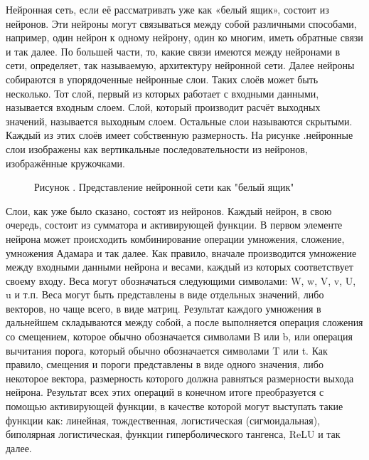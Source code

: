 {	\par \redline Нейронная сеть, если её рассматривать уже как «белый ящик», состоит из нейронов. Эти нейроны могут связываться между собой различными способами, например, один нейрон к одному нейрону, один ко многим, иметь обратные связи и так далее. По большей части, то, какие связи имеются между нейронами в сети, определяет, так называемую, архитектуру нейронной сети. Далее нейроны собираются в упорядоченные нейронные слои. Таких слоёв может быть несколько. Тот слой, первый из которых работает с входными данными, называется входным слоем. Слой, который производит расчёт выходных значений, называется выходным слоем. Остальные слои называются скрытыми. Каждый из этих слоёв имеет собственную размерность. На рисунке \thechaptercntr.\theimagecntr \spc нейронные слои изображены как вертикальные последовательности из нейронов, изображённые кружочками.
	
	\begin{figure}[H]
		\centering
		\def\svgwidth{\textwidth}
		
		\caption*{\gostFont Рисунок \thechaptercntr .\theimagecntr \spc {--} Представление нейронной сети как "белый ящик"}
		\label{fig:NNWhiteBox}
	\end{figure} \addtocounter{imagecntr}{1}
	
	\par \redline Слои, как уже было сказано, состоят из нейронов. Каждый нейрон, в свою очередь, состоит из сумматора и активирующей функции. В первом элементе нейрона может происходить комбинирование операции умножения, сложение, умножения Адамара и так далее. Как правило, вначале производится умножение между входными данными нейрона и весами, каждый из которых соответствует своему входу. Веса могут обозначаться следующими символами: W, w, V, v, U, u и т.п. Веса могут быть представлены в виде отдельных значений, либо векторов, но чаще всего, в виде матриц. Результат каждого умножения в дальнейшем складываются между собой, а после выполняется операция сложения со смещением, которое обычно обозначается символами B или b, или операция вычитания порога, который обычно обозначается символами T или t. Как правило, смещения и пороги представлены в виде одного значения, либо некоторое вектора, размерность которого должна равняться размерности выхода нейрона.  Результат всех этих операций в конечном итоге преобразуется с помощью активирующей функции, в качестве которой могут выступать такие функции как: линейная, тождественная, логистическая (сигмоидальная), биполярная логистическая, функции гиперболического тангенса, ReLU и так далее.  
	
}
